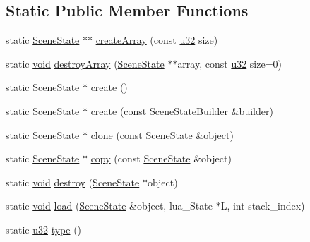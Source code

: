 \subsection*{Static Public Member Functions}
\begin{DoxyCompactItemize}
\item 
static \mbox{\hyperlink{classnjli_1_1_scene_state}{Scene\+State}} $\ast$$\ast$ \mbox{\hyperlink{classnjli_1_1_scene_state_a3010d62b1e488e95690af8cacfb33ed7}{create\+Array}} (const \mbox{\hyperlink{_util_8h_a10e94b422ef0c20dcdec20d31a1f5049}{u32}} size)
\item 
static \mbox{\hyperlink{_thread_8h_af1e856da2e658414cb2456cb6f7ebc66}{void}} \mbox{\hyperlink{classnjli_1_1_scene_state_a3e2d4d122ab498db3a958e2fa4ccf7c1}{destroy\+Array}} (\mbox{\hyperlink{classnjli_1_1_scene_state}{Scene\+State}} $\ast$$\ast$array, const \mbox{\hyperlink{_util_8h_a10e94b422ef0c20dcdec20d31a1f5049}{u32}} size=0)
\item 
static \mbox{\hyperlink{classnjli_1_1_scene_state}{Scene\+State}} $\ast$ \mbox{\hyperlink{classnjli_1_1_scene_state_a8a6f3696b73d1c5f62ef2aaeb7133cec}{create}} ()
\item 
static \mbox{\hyperlink{classnjli_1_1_scene_state}{Scene\+State}} $\ast$ \mbox{\hyperlink{classnjli_1_1_scene_state_a61241c7c75c26c8b101933f902d59426}{create}} (const \mbox{\hyperlink{classnjli_1_1_scene_state_builder}{Scene\+State\+Builder}} \&builder)
\item 
static \mbox{\hyperlink{classnjli_1_1_scene_state}{Scene\+State}} $\ast$ \mbox{\hyperlink{classnjli_1_1_scene_state_ade44964690e66b33e30c9523ebe946f5}{clone}} (const \mbox{\hyperlink{classnjli_1_1_scene_state}{Scene\+State}} \&object)
\item 
static \mbox{\hyperlink{classnjli_1_1_scene_state}{Scene\+State}} $\ast$ \mbox{\hyperlink{classnjli_1_1_scene_state_ac9a25b582796ba60d15b09afc316b1ef}{copy}} (const \mbox{\hyperlink{classnjli_1_1_scene_state}{Scene\+State}} \&object)
\item 
static \mbox{\hyperlink{_thread_8h_af1e856da2e658414cb2456cb6f7ebc66}{void}} \mbox{\hyperlink{classnjli_1_1_scene_state_a8d4e7fde5ccb368eba840abd98baa3ee}{destroy}} (\mbox{\hyperlink{classnjli_1_1_scene_state}{Scene\+State}} $\ast$object)
\item 
static \mbox{\hyperlink{_thread_8h_af1e856da2e658414cb2456cb6f7ebc66}{void}} \mbox{\hyperlink{classnjli_1_1_scene_state_afd1b0b2061bfc50bb2ee1bee6b201ed1}{load}} (\mbox{\hyperlink{classnjli_1_1_scene_state}{Scene\+State}} \&object, lua\+\_\+\+State $\ast$L, int stack\+\_\+index)
\item 
static \mbox{\hyperlink{_util_8h_a10e94b422ef0c20dcdec20d31a1f5049}{u32}} \mbox{\hyperlink{classnjli_1_1_scene_state_a4b0106f0f24fa972164621f077751de9}{type}} ()
\end{DoxyCompactItemize}
